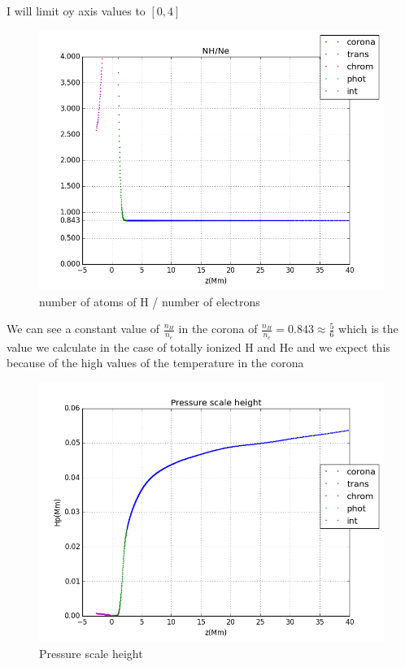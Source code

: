 \documentclass[10pt]{book}
\begin{document}
I will limit oy axis values to $ [0,4]$ 


\begin{figure}[!ht]
 \centering
 \includegraphics[scale=0.5]{nHDivNe.png}
 \caption{number of atoms of H / number of electrons }
\end{figure}

We can see a constant value of $\frac{n_H}{n_e}$ in the corona of $\frac{n_H}{n_e} = 0.843 \approx  \frac{5}{6}$ 
which is the value we calculate in the case of totally ionized H and He and we expect this because of the high values of
the temperature in the corona



\begin{figure}[!ht]
 \centering
 \includegraphics[scale=0.5]{hpLayers.png}
 \caption{Pressure scale height}
\end{figure}
\end{document}
